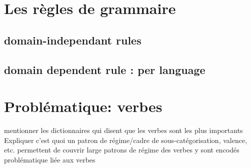 \section{Les règles de grammaire}
\subsection{domain-independant rules}
\subsection{domain dependent rule : per language}

\section{Problématique: verbes}
mentionner les dictionnaires qui disent que les verbes sont les plus importants
Expliquer c'est quoi un patron de régime/cadre de sous-catégorisation, valence, etc.
permettent de couvrir large
patrons de régime des verbes y sont encodés
problématique liée aux verbes
